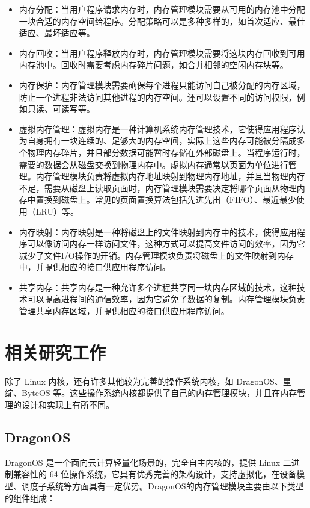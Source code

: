 \begin{itemize}
\item 内存分配：当用户程序请求内存时，内存管理模块需要从可用的内存池中分配一块合适的内存空间给程序。分配策略可以是多种多样的，如首次适应、最佳适应、最坏适应等。
\item 内存回收：当用户程序释放内存时，内存管理模块需要将这块内存回收到可用内存池中。回收时需要考虑内存碎片问题，如合并相邻的空闲内存块等。
\item 内存保护：内存管理模块需要确保每个进程只能访问自己被分配的内存区域，防止一个进程非法访问其他进程的内存空间。还可以设置不同的访问权限，例如只读、可读写等。
\item 虚拟内存管理：虚拟内存是一种计算机系统内存管理技术，它使得应用程序认为自身拥有一块连续的、足够大的内存空间，实际上这些内存可能被分隔成多个物理内存碎片，并且部分数据可能暂时存储在外部磁盘上。当程序运行时，需要的数据会从磁盘交换到物理内存中。虚拟内存通常以页面为单位进行管理。内存管理模块负责将虚拟内存地址映射到物理内存地址，并且当物理内存不足，需要从磁盘上读取页面时，内存管理模块需要决定将哪个页面从物理内存中置换到磁盘上。常见的页面置换算法包括先进先出（FIFO）、最近最少使用（LRU）等。
\item 内存映射：内存映射是一种将磁盘上的文件映射到内存中的技术，使得应用程序可以像访问内存一样访问文件，这种方式可以提高文件访问的效率，因为它减少了文件I/O操作的开销。内存管理模块负责将磁盘上的文件映射到内存中，并提供相应的接口供应用程序访问。
\item 共享内存：共享内存是一种允许多个进程共享同一块内存区域的技术，这种技术可以提高进程间的通信效率，因为它避免了数据的复制。内存管理模块负责管理共享内存区域，并提供相应的接口供应用程序访问。
\end{itemize}

\section{相关研究工作}

除了 Linux 内核，还有许多其他较为完善的操作系统内核，如 DragonOS、星绽、ByteOS 等。这些操作系统内核都提供了自己的内存管理模块，并且在内存管理的设计和实现上有所不同。

\subsection{DragonOS}

DragonOS 是一个面向云计算轻量化场景的，完全自主内核的，提供 Linux 二进制兼容性的 64 位操作系统，它具有优秀完善的架构设计，支持虚拟化，在设备模型、调度子系统等方面具有一定优势。DragonOS的内存管理模块主要由以下类型的组件组成：

